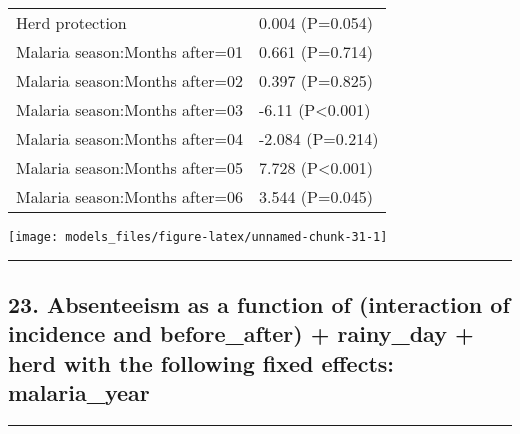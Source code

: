 \documentclass[]{article}
\begin{document}
\begin{longtable}[t]{ll}
\hspace{1em}Herd protection & 0.004 (P=0.054)\\
\hspace{1em}Malaria season:Months after=01 & 0.661 (P=0.714)\\
\hspace{1em}Malaria season:Months after=02 & 0.397 (P=0.825)\\
\hspace{1em}Malaria season:Months after=03 & -6.11 (P<0.001)\\
\hspace{1em}Malaria season:Months after=04 & -2.084 (P=0.214)\\
\hspace{1em}Malaria season:Months after=05 & 7.728 (P<0.001)\\
\hspace{1em}Malaria season:Months after=06 & 3.544 (P=0.045)\\*
\end{longtable}

\begin{center}\texttt{[image: models\_files/figure-latex/unnamed-chunk-31-1]} \end{center}

\newpage

\begin{center}\rule{0.5\linewidth}{\linethickness}\end{center}

\subsection{23. Absenteeism as a function of (interaction of incidence
and before\_after) + rainy\_day + herd with the following fixed effects:
malaria\_year}\label{absenteeism-as-a-function-of-interaction-of-incidence-and-before_after-rainy_day-herd-with-the-following-fixed-effects-malaria_year}

\begin{center}\rule{0.5\linewidth}{\linethickness}\end{center}
\end{document}
